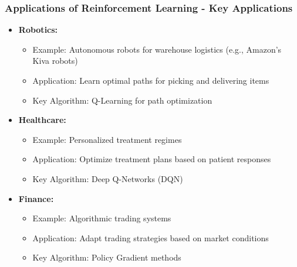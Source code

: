 \documentclass[aspectratio=169]{beamer}
\begin{document}
\begin{frame}[fragile]
    \frametitle{Applications of Reinforcement Learning - Key Applications}
    \begin{itemize}
        \item \textbf{Robotics:}
        \begin{itemize}
            \item Example: Autonomous robots for warehouse logistics (e.g., Amazon's Kiva robots)
            \item Application: Learn optimal paths for picking and delivering items
            \item Key Algorithm: Q-Learning for path optimization
        \end{itemize}
        
        \item \textbf{Healthcare:}
        \begin{itemize}
            \item Example: Personalized treatment regimes
            \item Application: Optimize treatment plans based on patient responses
            \item Key Algorithm: Deep Q-Networks (DQN)
        \end{itemize}
        
        \item \textbf{Finance:}
        \begin{itemize}
            \item Example: Algorithmic trading systems
            \item Application: Adapt trading strategies based on market conditions
            \item Key Algorithm: Policy Gradient methods
        \end{itemize}
    \end{itemize}
\end{frame}
\end{document}
